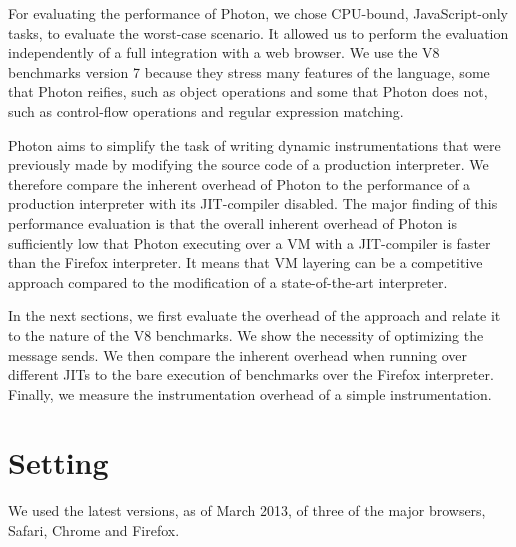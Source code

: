 For evaluating the performance of Photon, we chose CPU-bound, JavaScript-only
tasks, to evaluate the worst-case scenario. It allowed us to perform the
evaluation independently of a full integration with a web browser. We use the
V8 benchmarks version 7 because they stress many features of the language, some that
Photon reifies, such as object operations and some that Photon does not, such
as control-flow operations and regular expression matching.

Photon aims to simplify the task of writing dynamic instrumentations that were
previously made by modifying the source code of a production interpreter.
We therefore compare the inherent overhead of Photon to the performance of a
production interpreter with its JIT-compiler disabled. The major finding of
this performance evaluation is that the overall inherent overhead of Photon is
sufficiently low that Photon executing over a VM with a JIT-compiler is faster
than the Firefox interpreter.  It means that VM layering can be a competitive
approach compared to the modification of a state-of-the-art interpreter.

In the next sections, we first evaluate the overhead of the approach and relate
it to the nature of the V8 benchmarks. We show the necessity of optimizing the
message sends. We then compare the inherent overhead when running over
different JITs to the bare execution of benchmarks over the Firefox
interpreter. Finally, we measure the instrumentation overhead of a simple
instrumentation.

\section{Setting}

We used the latest versions, as of March 2013, of three of the major browsers,
Safari, Chrome and Firefox.

